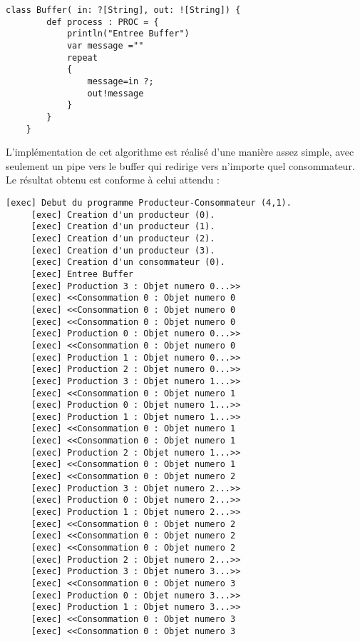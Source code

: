 \documentclass[a4paper,11pt,french]{report}
\begin{document}
\begin{lstlisting}[frame=trBL,title={Producteurs-Consommateurs : Buffer}, firstnumber=last]    
    class Buffer( in: ?[String], out: ![String]) {
        def process : PROC = {
            println("Entree Buffer")
            var message =""
            repeat 
            {
                message=in ?; 
                out!message
            }
        }
    }
\end{lstlisting} 

L'implémentation de cet algorithme est réalisé d'une manière assez simple, avec seulement un pipe vers le buffer qui redirige vers n'importe quel consommateur.\\
Le résultat obtenu est conforme à celui attendu :

\begin{lstlisting}[frame=trBL,title={Producteurs-Consommateurs : Résultat de l'éxécution}, firstnumber=last]   
     [exec] Debut du programme Producteur-Consommateur (4,1).
     [exec] Creation d'un producteur (0).
     [exec] Creation d'un producteur (1).
     [exec] Creation d'un producteur (2).
     [exec] Creation d'un producteur (3).
     [exec] Creation d'un consommateur (0).
     [exec] Entree Buffer
     [exec] Production 3 : Objet numero 0...>>
     [exec] <<Consommation 0 : Objet numero 0
     [exec] <<Consommation 0 : Objet numero 0
     [exec] <<Consommation 0 : Objet numero 0
     [exec] Production 0 : Objet numero 0...>>
     [exec] <<Consommation 0 : Objet numero 0
     [exec] Production 1 : Objet numero 0...>>
     [exec] Production 2 : Objet numero 0...>>
     [exec] Production 3 : Objet numero 1...>>
     [exec] <<Consommation 0 : Objet numero 1
     [exec] Production 0 : Objet numero 1...>>
     [exec] Production 1 : Objet numero 1...>>
     [exec] <<Consommation 0 : Objet numero 1
     [exec] <<Consommation 0 : Objet numero 1
     [exec] Production 2 : Objet numero 1...>>
     [exec] <<Consommation 0 : Objet numero 1
     [exec] <<Consommation 0 : Objet numero 2
     [exec] Production 3 : Objet numero 2...>>
     [exec] Production 0 : Objet numero 2...>>
     [exec] Production 1 : Objet numero 2...>>
     [exec] <<Consommation 0 : Objet numero 2
     [exec] <<Consommation 0 : Objet numero 2
     [exec] <<Consommation 0 : Objet numero 2
     [exec] Production 2 : Objet numero 2...>>
     [exec] Production 3 : Objet numero 3...>>
     [exec] <<Consommation 0 : Objet numero 3
     [exec] Production 0 : Objet numero 3...>>
     [exec] Production 1 : Objet numero 3...>>
     [exec] <<Consommation 0 : Objet numero 3
     [exec] <<Consommation 0 : Objet numero 3

\end{lstlisting}
\end{document}
